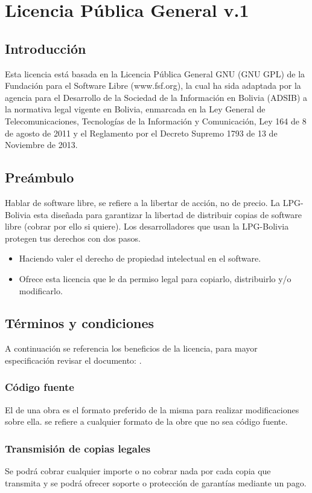 \chapter{Licencia Pública General v.1} \label{chap:LPG-Bolivia}

\section{Introducción}

Esta licencia está basada en la Licencia Pública General GNU (GNU GPL) de la
Fundación para el Software Libre (www.fsf.org), la cual ha sida adaptada por
la agencia para el Desarrollo de la Sociedad de la Información en Bolivia 
(ADSIB) a la normativa legal vigente en Bolivia, enmarcada en la Ley General
de Telecomunicaciones, Tecnologías de la Información y Comunicación, Ley 164
de 8 de agosto de 2011 y el Reglamento por el Decreto Supremo 1793 de 13 de
Noviembre de 2013. \cite{LPGBolivia}
 
\section{Preámbulo}

Hablar de software libre, se refiere a la libertar de acción, no de precio.
La LPG-Bolivia esta diseñada para garantizar la libertad de distribuir
copias de software libre (cobrar por ello si quiere). Los desarrolladores
que usan la LPG-Bolivia protegen tus derechos con dos pasos. \cite{LPGBolivia}

\begin{itemize}

\item Haciendo valer el derecho de propiedad intelectual en el software.

\item Ofrece esta licencia que le da permiso legal para copiarlo,
distribuirlo y/o modificarlo.
\end{itemize}

\section{Términos y condiciones}

A continuación se referencia los beneficios de la licencia, para mayor
especificación revisar el documento: \cite{LPGBolivia}.

\subsection{Código fuente}

El  de una obra es el formato preferido de la
misma para realizar modificaciones sobre ella. 
se refiere a cualquier formato de la obre que no sea código fuente.
\cite{LPGBolivia}

\subsection{Transmisión de copias legales}

Se podrá cobrar cualquier importe o no cobrar nada por cada copia que
transmita y se podrá ofrecer soporte o protección de garantías mediante un
pago. \cite{LPGBolivia}